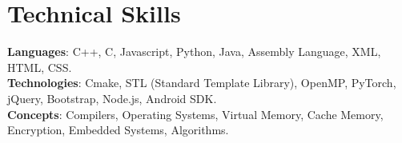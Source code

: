 \section{Technical Skills}
    \begin{itemize}[leftmargin=0.15in, label={}]
	\small{\item{
		\textbf{Languages}{: C++, C, Javascript, Python, Java, Assembly Language, XML, HTML, CSS.} \\
		\textbf{Technologies}{: Cmake, STL (Standard Template Library), OpenMP, PyTorch, jQuery, Bootstrap, Node.js, Android SDK.} \\
		\textbf{Concepts}{: Compilers, Operating Systems, Virtual Memory, Cache Memory, Encryption, Embedded Systems, Algorithms.}
	}}
    \end{itemize}